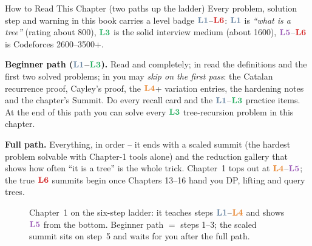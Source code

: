 \begin{chaptertheorybox}{How to Read This Chapter (two paths up the ladder)}
Every problem, solution step and warning in this book carries a level badge
$\lv1$--$\lv6$: $\lv1$ is \emph{``what is a tree''} (rating about 800), $\lv3$ is the
solid interview medium (about 1600), $\lv5$--$\lv6$ is Codeforces 2600--3500+.

\textbf{Beginner path ($\lv1$--$\lv3$).} Read  and
 completely; in  read the definitions and the
first two solved problems; in  you may \emph{skip on the first
pass}: the Catalan recurrence proof, Cayley's proof, the $\lv4$+ variation entries,
the hardening notes and the chapter's Summit. Do every recall card and the
$\lv1$--$\lv3$ practice items. At the end of this path you can solve every
$\lv3$ tree-recursion problem in this chapter.

\textbf{Full path.} Everything, in order -- it ends with a scaled summit
(the hardest problem solvable with Chapter-1 tools alone) and the reduction gallery
that shows how often ``it is a tree'' is the whole trick. Chapter~1 tops out at
$\lv4$--$\lv5$; the true $\lv6$ summits begin once Chapters 13--16 hand you DP,
lifting and query trees.
\end{chaptertheorybox}

\begin{figure}[H]
\centering
{}
\caption*{Chapter~1 on the six-step ladder: it teaches steps $\lv1$--$\lv4$ and
shows $\lv5$ from the bottom. Beginner path $=$ steps 1--3; the scaled summit sits
on step~5 and waits for you after the full path.}
\end{figure}

